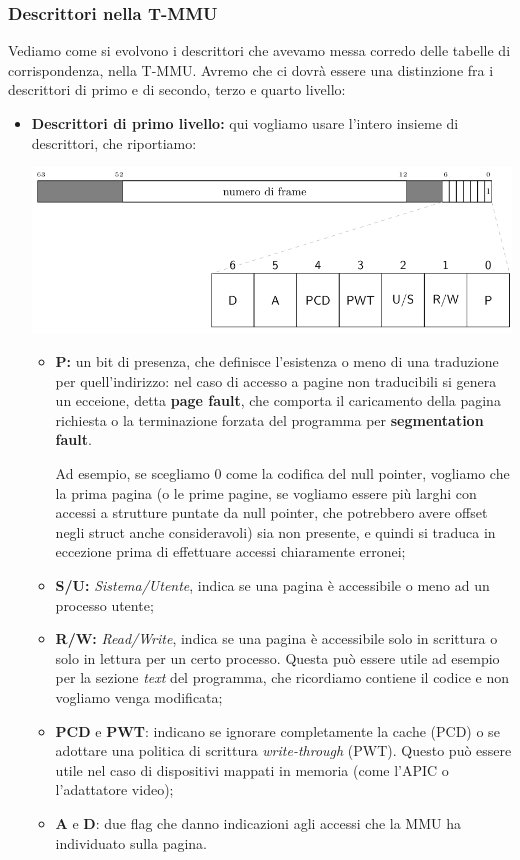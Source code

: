 \documentclass[a4paper,11pt]{article}
\begin{document}
\subsubsection{Descrittori nella T-MMU}
Vediamo come si evolvono i descrittori che avevamo messa corredo delle tabelle di corrispondenza, nella T-MMU.
Avremo che ci dovrà essere una distinzione fra i descrittori di primo e di secondo, terzo e quarto livello:

\newpage

\begin{itemize}
	\item \textbf{Descrittori di primo livello:}
		qui vogliamo usare l'intero insieme di descrittori, che riportiamo:
\begin{center}
	\includegraphics[scale=0.6]{../figures/mmu_level1.png}
\end{center}
\begin{itemize}
	\item \textbf{P:} un bit di presenza, che definisce l'esistenza o meno di una traduzione per quell'indirizzo: nel caso di accesso a pagine non traducibili si genera un ecceione, detta \textbf{page fault}, che comporta il caricamento della pagina richiesta o la terminazione forzata del programma per \textbf{segmentation fault}.

		Ad esempio, se scegliamo 0 come la codifica del null pointer, vogliamo che la prima pagina (o le prime pagine, se vogliamo essere più larghi con accessi a strutture puntate da null pointer, che potrebbero avere offset negli struct anche consideravoli) sia non presente, e quindi si traduca in eccezione prima di effettuare accessi chiaramente erronei;
	\item \textbf{S/U:} \textit{Sistema/Utente}, indica se una pagina è accessibile o meno ad un processo utente;  
	\item \textbf{R/W:} \textit{Read/Write}, indica se una pagina è accessibile solo in scrittura o solo in lettura per un certo processo. 
		Questa può essere utile ad esempio per la sezione \textit{text} del programma, che ricordiamo contiene il codice e non vogliamo venga modificata;
	\item \textbf{PCD} e \textbf{PWT}: indicano se ignorare completamente la cache (PCD) o se adottare una politica di scrittura \textit{write-through} (PWT).
		Questo può essere utile nel caso di dispositivi mappati in memoria (come l'APIC o l'adattatore video);
	\item \textbf{A} e \textbf{D}: due flag che danno indicazioni agli accessi che la MMU ha individuato sulla pagina.


\end{itemize}
\end{itemize}
\end{document}
